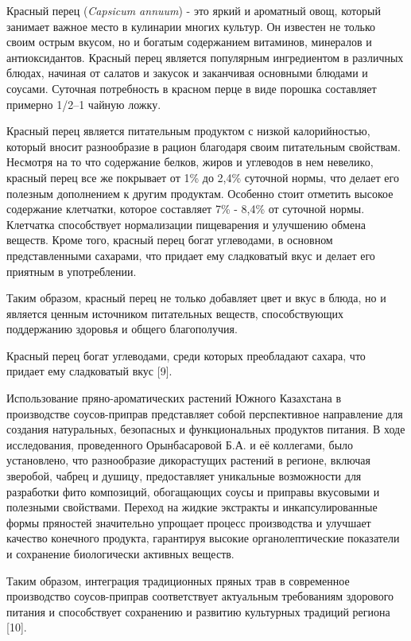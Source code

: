 \begin{multicols}{2}
Красный перец (\emph{Capsicum annuum}) - это яркий и ароматный овощ,
который занимает важное место в кулинарии многих культур. Он известен не
только своим острым вкусом, но и богатым содержанием витаминов,
минералов и антиоксидантов. Красный перец является популярным
ингредиентом в различных блюдах, начиная от салатов и закусок и
заканчивая основными блюдами и соусами. Суточная потребность в красном
перце в виде порошка составляет примерно 1/2--1 чайную ложку.

Красный перец является питательным продуктом с низкой калорийностью,
который вносит разнообразие в рацион благодаря своим питательным
свойствам. Несмотря на то что содержание белков, жиров и углеводов в нем
невелико, красный перец все же покрывает от 1\% до 2,4\% суточной нормы,
что делает его полезным дополнением к другим продуктам. Особенно стоит
отметить высокое содержание клетчатки, которое составляет 7\% - 8,4\% от
суточной нормы. Клетчатка способствует нормализации пищеварения и
улучшению обмена веществ. Кроме того, красный перец богат углеводами, в
основном представленными сахарами, что придает ему сладковатый вкус и
делает его приятным в употреблении.

Таким образом, красный перец не только добавляет цвет и вкус в блюда, но
и является ценным источником питательных веществ, способствующих
поддержанию здоровья и общего благополучия.

Красный перец богат углеводами, среди которых преобладают сахара, что
придает ему сладковатый вкус {[}9{]}.

Использование пряно-ароматических растений Южного Казахстана в
производстве соусов-приправ представляет собой перспективное направление
для создания натуральных, безопасных и функциональных продуктов питания.
В ходе исследования, проведенного Орынбасаровой Б.А. и её коллегами,
было установлено, что разнообразие дикорастущих растений в регионе,
включая зверобой, чабрец и душицу, предоставляет уникальные возможности
для разработки фито композиций, обогащающих соусы и приправы вкусовыми и
полезными свойствами. Переход на жидкие экстракты и инкапсулированные
формы пряностей значительно упрощает процесс производства и улучшает
качество конечного продукта, гарантируя высокие органолептические
показатели и сохранение биологически активных веществ.

Таким образом, интеграция традиционных пряных трав в современное
производство соусов-приправ соответствует актуальным требованиям
здорового питания и способствует сохранению и развитию культурных
традиций региона {[}10{]}.


\end{multicols}
